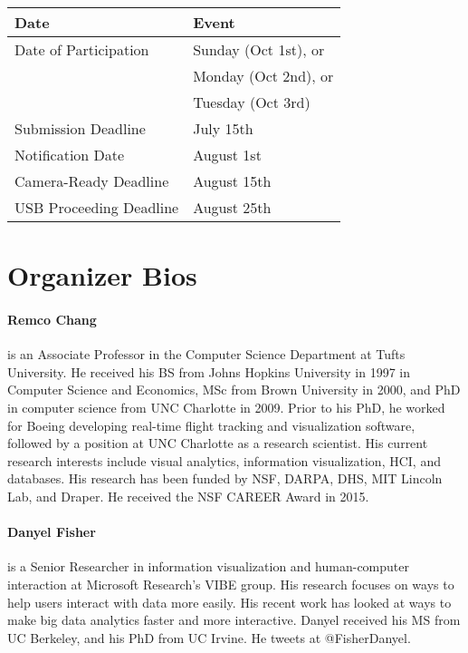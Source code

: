 \documentclass[journal]{vgtc}                %
\begin{document}
\begin{center}
\begin{tabular}{ l l } 
 \hline
 Date & Event \\ 
 \hline
  Date of Participation & Sunday (Oct 1st), or \\
					& Monday (Oct 2nd), or \\
					& Tuesday (Oct 3rd)\\
  Submission Deadline & July 15th \\
  Notification Date & August 1st\\
  Camera-Ready Deadline & August 15th\\
  USB Proceeding Deadline & August 25th\\
 \hline
\end{tabular}
\end{center}



\section{Organizer Bios}

\paragraph*{Remco Chang} is an Associate Professor in the Computer Science Department at Tufts University. He received his BS from Johns Hopkins University in 1997 in Computer Science and Economics, MSc from Brown University in 2000, and PhD in computer science from UNC Charlotte in 2009. Prior to his PhD, he worked for Boeing developing real-time flight tracking and visualization software, followed by a position at UNC Charlotte as a research scientist. His current research interests include visual analytics, information visualization, HCI, and databases. His research has been funded by NSF, DARPA, DHS, MIT Lincoln Lab, and Draper. He received the NSF CAREER Award in 2015.

\paragraph*{Danyel Fisher} is a Senior Researcher in information visualization and human-computer interaction at Microsoft Research's VIBE group. His research focuses on ways to help users interact with data more easily. His recent work has looked at ways to make big data analytics faster and more interactive. Danyel received his MS from UC Berkeley, and his PhD from UC Irvine. He tweets at @FisherDanyel.
\end{document}
